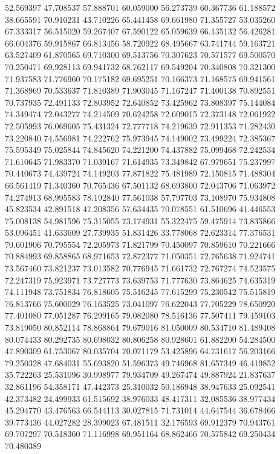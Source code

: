 52.569397
47.708537
57.888701
60.059000
56.273739
60.367736
61.188572
38.665591
70.910231
43.710226
65.441458
69.661980
71.355727
53.035260
67.333317
56.515020
59.267407
67.590122
65.059639
66.135132
56.426281
66.604376
59.915867
66.813456
58.720922
68.495667
63.741744
59.163721
63.527409
61.870565
69.710300
69.513756
70.307623
70.571577
69.500570
70.250471
69.928113
69.941732
68.762117
69.549204
70.340808
70.321300
71.937583
71.776960
70.175182
69.695251
70.166373
71.168575
69.941561
71.368969
70.533637
71.810389
71.903045
71.167247
71.400138
70.892551
70.737935
72.491133
72.803952
72.640852
73.425962
73.808397
75.144084
74.349474
72.043277
74.214509
70.624258
72.609015
72.373148
72.061922
72.505993
76.069605
75.431324
72.777718
74.219639
72.911353
71.282430
73.220840
74.556981
74.222762
75.973945
74.149002
73.499224
72.385367
75.595349
75.025844
74.845620
74.221200
74.437882
75.099468
72.242534
71.610645
71.983370
71.039167
71.614935
73.349842
67.979651
75.237997
70.440673
74.439724
74.149203
77.871822
75.481989
72.150815
71.488304
66.561419
71.340360
70.765436
67.501132
68.693800
72.043706
71.063972
74.274913
68.995583
78.192840
77.561038
57.797703
73.108970
75.934808
45.823534
42.891518
47.208356
57.634435
70.078551
61.510696
41.446553
75.008138
54.981596
75.315055
73.174931
55.322475
59.475914
73.835866
53.096451
41.633609
27.739935
51.831426
33.778068
72.623314
77.376531
70.601906
70.795554
72.205973
71.821799
70.450097
70.859610
70.221666
70.884993
69.858865
68.971653
72.872377
71.050351
72.765638
71.924741
73.567460
73.821237
73.013582
70.776945
71.661732
72.767274
74.523575
72.247319
75.923971
73.727773
73.639753
71.777630
73.864625
74.635319
74.111948
73.751834
76.818605
75.516245
77.615299
75.230542
75.515819
76.813766
75.600029
76.163525
73.041097
76.622043
77.705229
78.650920
77.401080
77.051287
76.299165
79.082080
78.516136
77.507411
79.459103
73.819050
80.852114
78.868864
79.679016
81.050009
80.534710
81.489408
80.074433
80.292735
80.698032
80.806258
80.928601
61.882200
54.284500
47.890309
61.753067
80.035704
70.071179
53.425896
64.731617
56.203166
79.250328
47.684031
55.693820
51.596373
49.746968
81.657349
46.419852
35.722263
25.531096
30.998977
79.934709
49.267474
49.887924
21.837637
32.861196
54.358171
47.442373
25.310032
50.186948
38.947633
25.092541
42.373482
24.499933
61.515692
38.976033
48.417311
32.085536
38.977434
45.294770
43.476563
66.544113
30.027815
71.731014
44.647544
36.678466
39.773436
44.027282
28.399023
67.481511
32.176593
69.912379
70.943761
69.707297
70.518360
71.116998
69.951164
68.862466
70.575842
69.250434
70.480389
